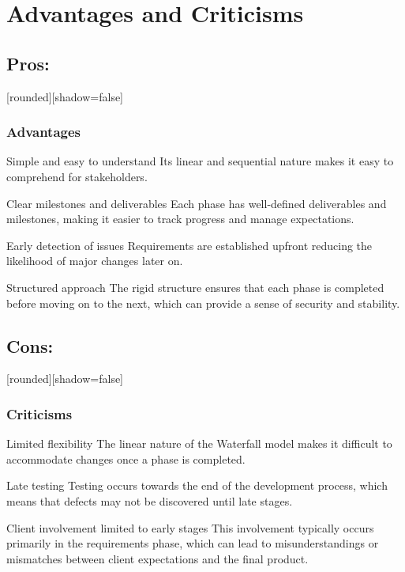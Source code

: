 \documentclass[10pt]{beamer}
\begin{document}

\section{Advantages and Criticisms}
\subsection{Pros:}

\begin{frame}
[rounded][shadow=false]
\frametitle{Advantages}

\begin{block}{Simple and easy to understand}
Its linear and sequential nature makes it easy to comprehend for stakeholders.
\end{block}

\begin{block}{Clear milestones and deliverables}
Each phase has well-defined deliverables and milestones, making it easier to track progress and manage expectations.
\end{block}

\begin{block}{Early detection of issues}
Requirements are established upfront reducing the likelihood of major changes later on.
\end{block}

\begin{block}{Structured approach}
The rigid structure ensures that each phase is completed before moving on to the next, which can provide a sense of security and stability.
\end{block}

\end{frame}

\subsection{Cons:}

\begin{frame}
[rounded][shadow=false]
\frametitle{Criticisms}

\begin{block}{Limited flexibility}
The linear nature of the Waterfall model makes it difficult to accommodate changes once a phase is completed.
\end{block}

\begin{block}{Late testing}
Testing occurs towards the end of the development process, which means that defects may not be discovered until late stages.
\end{block}

\begin{block}{Client involvement limited to early stages}
This involvement typically occurs primarily in the requirements phase, which can lead to misunderstandings or mismatches between client expectations and the final product.
\end{block}

\end{frame}
\end{document}
